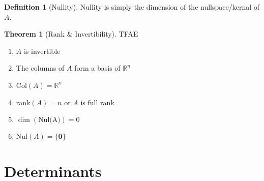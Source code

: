 \documentclass{article}
\numberwithin{equation}{section}
\theoremstyle{definition}
\newtheorem{thm}{Theorem}[subsection]
\newtheorem{defn}{Definition}[subsection]
\newcommand{\R}{\mathbb{R}}
\theoremstyle{adefn}
\begin{document}
	\begin{defn}[Nullity]
		Nullity is simply the dimension of the nullspace/kernal of $A$.
	\end{defn}
	\begin{thm}[Rank \& Invertibility]
		TFAE
		\begin{enumerate}
			\itemsep0em
			\item $A$  is invertible 
			\item The columns of $A$ form a basis of $\R^n$
			\item Col$(A) = \R^n$
			\item rank$(A) = n$ or $A$ is full rank
			\item $\dim(\text{Nul(A)}) = 0$
			\item Nul$(A) = \{ \mathbf{0} \}$
		\end{enumerate}
	\end{thm}
	
	\section{Determinants}
	
\end{document}
